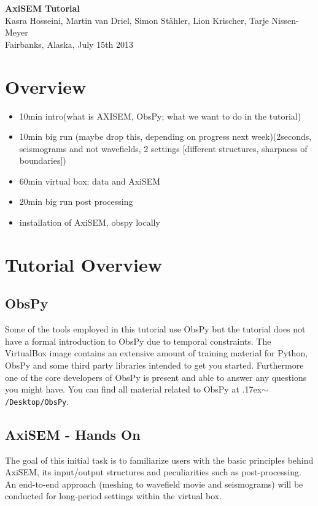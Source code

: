 \documentclass{article}
\newcommand{\ttilde}[0]{\raise.17ex\hbox{$\scriptstyle\sim$}}
\begin{document}
\begin{center}
\title{}
\LARGE{ \textbf{\sc AxiSEM Tutorial}}
\vspace*{0.1cm}\\
{\large 
Kasra Hosseini, Martin van Driel, Simon St\"{a}hler, 
Lion Krischer, Tarje Nissen-Meyer \\
{Fairbanks, Alaska, July 15th 2013}
}
\end{center}

\section{Overview}
\baselineskip=13pt
%
\begin{itemize}
\item 10min intro(what is AXISEM, ObsPy; what we want to do in the tutorial)
\item 10min big run (maybe drop this, depending on progress next week)(2seconds, seismograms 
and not wavefields, 2 settings [different structures, sharpness of boundaries])
\item  60min virtual box: data and AxiSEM
\item  20min big run post processing
\item installation of AxiSEM, obspy locally
\end{itemize}
%
\section{Tutorial Overview}
%
\subsection{ObsPy}
Some of the tools employed in this tutorial use ObsPy but the tutorial
does not have a formal introduction to ObsPy due to temporal
constraints. The VirtualBox image contains an extensive amount of
training material for Python, ObsPy and some third party libraries
intended to get you started. Furthermore one of the core developers of
ObsPy is present and able to answer any questions you might have. You
can find all material related to ObsPy at \ttilde\verb|/Desktop/ObsPy|.
%
\subsection{AxiSEM - Hands On}
The goal of this initial task is to familiarize users with the basic
principles behind AxiSEM, its input/output structures and
peculiarities such as post-processing. An end-to-end approach (meshing to
wavefield movie and seismograms) will be conducted for long-period
settings within the virtual box.
%
\end{document}
